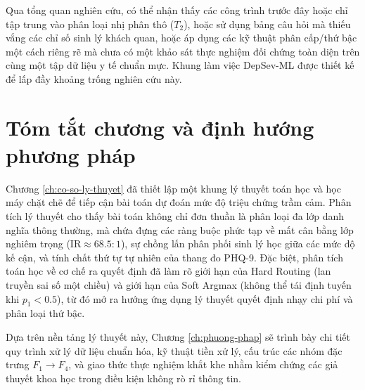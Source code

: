 Qua tổng quan nghiên cứu, có thể nhận thấy các công trình trước đây hoặc chỉ tập trung vào phân loại nhị phân thô ($T_2$), hoặc sử dụng bảng câu hỏi mà thiếu vắng các chỉ số sinh lý khách quan, hoặc áp dụng các kỹ thuật phân cấp/thứ bậc một cách riêng rẽ mà chưa có một khảo sát thực nghiệm đối chứng toàn diện trên cùng một tập dữ liệu y tế chuẩn mực. Khung làm việc DepSev-ML được thiết kế để lấp đầy khoảng trống nghiên cứu này.

\section{Tóm tắt chương và định hướng phương pháp}
\label{sec:tom-tat-chuong-2}

Chương \ref{ch:co-so-ly-thuyet} đã thiết lập một khung lý thuyết toán học và học máy chặt chẽ để tiếp cận bài toán dự đoán mức độ triệu chứng trầm cảm. Phân tích lý thuyết cho thấy bài toán không chỉ đơn thuần là phân loại đa lớp danh nghĩa thông thường, mà chứa đựng các ràng buộc phức tạp về mất cân bằng lớp nghiêm trọng ($\text{IR} \approx 68.5:1$), sự chồng lấn phân phối sinh lý học giữa các mức độ kế cận, và tính chất thứ tự tự nhiên của thang đo PHQ-9. Đặc biệt, phân tích toán học về cơ chế ra quyết định đã làm rõ giới hạn của Hard Routing (lan truyền sai số một chiều) và giới hạn của Soft Argmax (không thể tái định tuyến khi $p_1 < 0.5$), từ đó mở ra hướng ứng dụng lý thuyết quyết định nhạy chi phí và phân loại thứ bậc.

Dựa trên nền tảng lý thuyết này, Chương \ref{ch:phuong-phap} sẽ trình bày chi tiết quy trình xử lý dữ liệu chuẩn hóa, kỹ thuật tiền xử lý, cấu trúc các nhóm đặc trưng $F_1 \to F_4$, và giao thức thực nghiệm khắt khe nhằm kiểm chứng các giả thuyết khoa học trong điều kiện không rò rỉ thông tin.
\cleardoublepage

